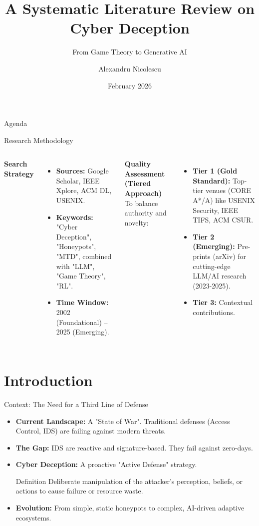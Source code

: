 \documentclass[12pt, aspectratio=169]{beamer}
\title[SLR on Cyber Deception]{A Systematic Literature Review on Cyber Deception}
\subtitle{From Game Theory to Generative AI}
\author{Alexandru Nicolescu}
\institute[Unibo]{University of Bologna, MSc in Computer Science}
\date{February 2026}
\begin{document}
\maketitle

\begin{frame}{Agenda}
    \tableofcontents
\end{frame}

\begin{frame}{Research Methodology}
    \begin{columns}
        \textbf{Search Strategy}
        \begin{itemize}
            \item \textbf{Sources:} Google Scholar, IEEE Xplore, ACM DL, USENIX.
            \item \textbf{Keywords:} "Cyber Deception", "Honeypots", "MTD", combined with "LLM", "Game Theory", "RL".
            \item \textbf{Time Window:} 2002 (Foundational) -- 2025 (Emerging).
        \end{itemize}

        \textbf{Quality Assessment (Tiered Approach)}
        To balance authority and novelty:
        \begin{itemize}
            \item \textbf{Tier 1 (Gold Standard):} Top-tier venues (CORE A*/A) like USENIX Security, IEEE TIFS, ACM CSUR.
            \item \textbf{Tier 2 (Emerging):} Pre-prints (arXiv) for cutting-edge LLM/AI research (2023-2025).
            \item \textbf{Tier 3:} Contextual contributions.
        \end{itemize}
    \end{columns}
\end{frame}

\section{Introduction}
\begin{frame}{Context: The Need for a Third Line of Defense}
    \begin{itemize}
        \item \textbf{Current Landscape:} A "State of War". Traditional defenses (Access Control, IDS) are failing against modern threats.
        \item \textbf{The Gap:} IDS are reactive and signature-based. They fail against zero-days.
        \item \textbf{Cyber Deception:} A proactive "Active Defense" strategy.
              \begin{block}{Definition}
                  Deliberate manipulation of the attacker's perception, beliefs, or actions to cause failure or resource waste.
              \end{block}
        \item \textbf{Evolution:} From simple, static honeypots to complex, AI-driven adaptive ecosystems.
    \end{itemize}
\end{frame}
\end{document}
